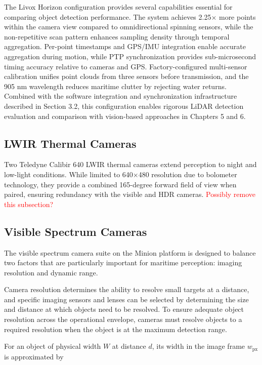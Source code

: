 \documentclass{erauthesis}
\begin{document}
The Livox Horizon configuration provides several capabilities essential for comparing object detection performance.
The system achieves 2.25× more points within the camera view compared to omnidirectional spinning sensors, while the non-repetitive scan pattern enhances sampling density through temporal aggregation.
Per-point timestamps and \ac{GPS}/\ac{IMU} integration enable accurate aggregation during motion, while \ac{PTP} synchronization provides sub-microsecond timing accuracy relative to cameras and \ac{GPS}.
Factory-configured multi-sensor calibration unifies point clouds from three sensors before transmission, and the 905 nm wavelength reduces maritime clutter by rejecting water returns.
Combined with the software integration and synchronization infrastructure described in Section 3.2, this configuration enables rigorous \ac{LiDAR} detection evaluation and comparison with vision-based approaches in Chapters 5 and 6.

\subsection{LWIR Thermal Cameras} \label{sensors_LWIR}
Two Teledyne Calibir 640 \ac{LWIR} thermal cameras extend perception to night and low-light conditions. 
While limited to 640×480 resolution due to bolometer technology, they provide a combined 165-degree forward field of view when paired, ensuring redundancy with the
visible and \ac{HDR} cameras.
\textcolor{red}{Possibly remove this subsection?}

\subsection{Visible Spectrum Cameras} \label{visual_cameras}

The visible spectrum camera suite on the Minion platform is designed to balance two factors that are particularly important for maritime perception: imaging resolution and dynamic range.  

Camera resolution determines the ability to resolve small targets at a distance, and specific imaging sensors and lenses can be selected by determining the size and distance at which objects need to be resolved.
To ensure adequate object resolution across the operational envelope, cameras must resolve objects to a required resolution when the object is at the maximum detection range.

For an object of physical width $W$ at distance $d$, its width in the image frame $w_{\text{px}}$ is approximated by
\end{document}

